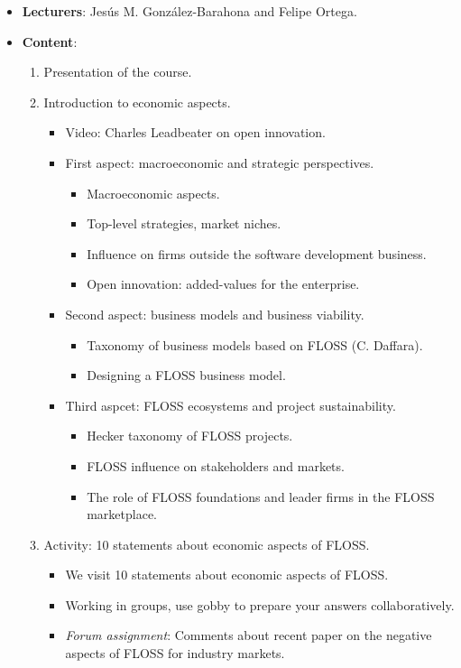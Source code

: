 \documentclass[a4paper]{article}
\begin{document}
\begin{itemize}
 \item \textbf{Lecturers}: Jesús M. González-Barahona and Felipe Ortega.

 \item \textbf{Content}:

    \begin{enumerate}
     \item Presentation of the course.
     \item Introduction to economic aspects.
	\begin{itemize}
	 \item Video: Charles Leadbeater on open innovation.
	 \item First aspect: macroeconomic and strategic perspectives.
	  \begin{itemize}
	   \item Macroeconomic aspects.
	   \item Top-level strategies, market niches.
	   \item Influence on firms outside the software development business.
	   \item Open innovation: added-values for the enterprise.
	  \end{itemize}

	 \item Second aspect: business models and business viability.
	   \begin{itemize}
	    \item Taxonomy of business models based on FLOSS (C. Daffara).
	    \item Designing a FLOSS business model.
	   \end{itemize}

	 \item Third aspcet: FLOSS ecosystems and project sustainability.
	    \begin{itemize}
	     \item Hecker taxonomy of FLOSS projects.
	     \item FLOSS influence on stakeholders and markets.
	     \item The role of FLOSS foundations and leader firms in the FLOSS marketplace.
	    \end{itemize}

	\end{itemize}

     \item Activity: 10 statements about economic aspects of FLOSS.
	  \begin{itemize}
	   \item We visit 10 statements about economic aspects of FLOSS.
	   \item Working in groups, use gobby to prepare your answers collaboratively.
	   \item \textit{Forum assignment}: Comments about recent paper on the negative aspects of FLOSS for industry markets.
	  \end{itemize}


\end{enumerate}
\end{itemize}
\end{document}
